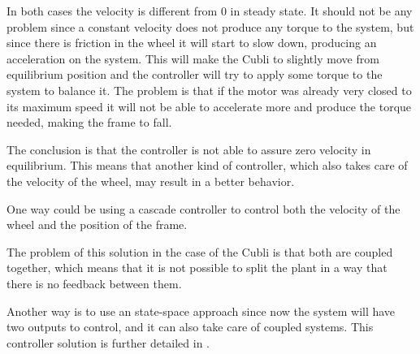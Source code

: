 In both cases the velocity is different from 0 in steady state. It should not be any problem since a constant velocity does not produce any torque 
to the system, but since there is friction in the wheel it will start to slow down, producing an acceleration on the system. This will make the Cubli to slightly move from equilibrium position and the controller will try to apply some torque to the system to balance it. The problem is that if the motor was already very closed to its maximum speed it will not be able to accelerate more and produce the torque needed, making the frame to fall.

The conclusion is that the controller is not able to assure zero velocity in equilibrium. This means that another kind of controller, which also takes care of the velocity of the wheel, may result in a better behavior.

One way could be using a cascade controller to control both the velocity of the wheel and the position of the frame. 


The problem of this solution in the case of the Cubli is that both are coupled together, which means that it is not possible to split the plant in a way that there is no feedback between them. 

Another way is to use an state-space approach since now the system will have two outputs to control, and it can also take care of coupled systems. This controller solution is further detailed in .
